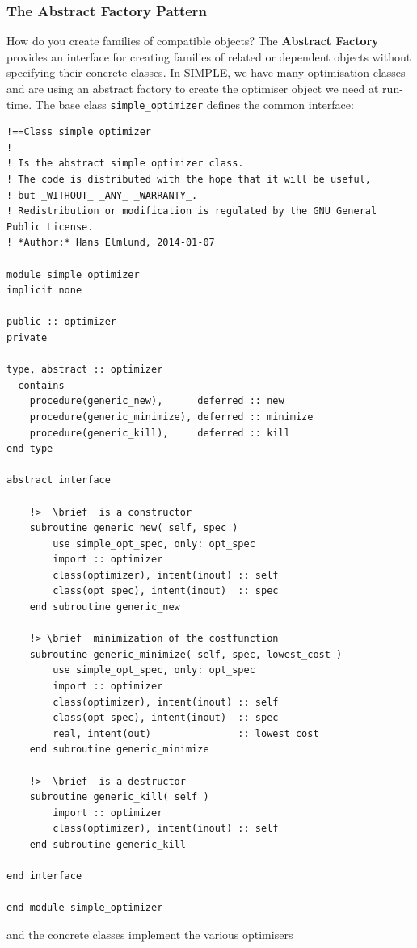 \documentclass[a4paper,11pt]{article}
\begin{document}
\subsubsection{The Abstract Factory Pattern}
How do you create families of compatible objects? The \textbf{Abstract Factory} provides an interface for creating families of related or dependent objects without specifying their concrete classes. In SIMPLE, we have many optimisation classes and are using an abstract factory to create the optimiser object we need at run-time. The base class \texttt{simple\_optimizer} defines the common interface:
\begin{verbatim}
!==Class simple_optimizer
!
! Is the abstract simple optimizer class.
! The code is distributed with the hope that it will be useful, 
! but _WITHOUT_ _ANY_ _WARRANTY_. 
! Redistribution or modification is regulated by the GNU General Public License. 
! *Author:* Hans Elmlund, 2014-01-07

module simple_optimizer
implicit none

public :: optimizer
private

type, abstract :: optimizer
  contains
    procedure(generic_new),      deferred :: new
    procedure(generic_minimize), deferred :: minimize
    procedure(generic_kill),     deferred :: kill 
end type

abstract interface

    !>  \brief  is a constructor
    subroutine generic_new( self, spec ) 
        use simple_opt_spec, only: opt_spec
        import :: optimizer
        class(optimizer), intent(inout) :: self
        class(opt_spec), intent(inout)  :: spec
    end subroutine generic_new
    
    !> \brief  minimization of the costfunction
    subroutine generic_minimize( self, spec, lowest_cost )
        use simple_opt_spec, only: opt_spec
        import :: optimizer
        class(optimizer), intent(inout) :: self
        class(opt_spec), intent(inout)  :: spec
        real, intent(out)               :: lowest_cost
    end subroutine generic_minimize
    
    !>  \brief  is a destructor
    subroutine generic_kill( self ) 
        import :: optimizer
        class(optimizer), intent(inout) :: self
    end subroutine generic_kill
 
end interface

end module simple_optimizer
\end{verbatim}
and the concrete classes implement the various optimisers
\end{document}
